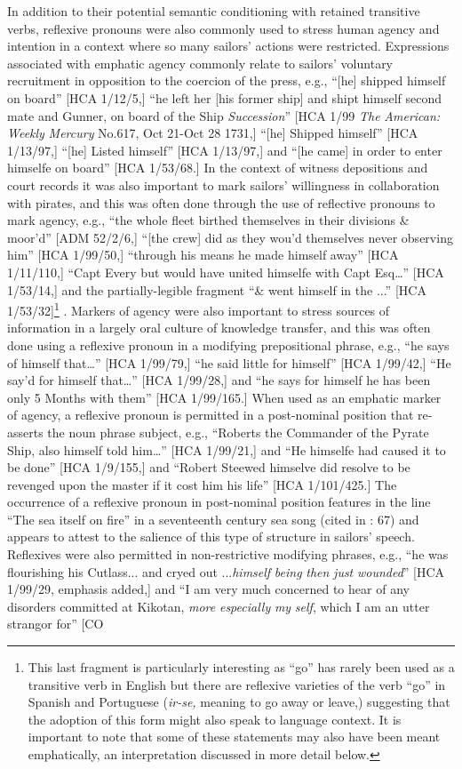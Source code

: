   In addition to their potential semantic conditioning with retained transitive verbs, reflexive pronouns were also commonly used to stress human agency and intention in a context where so many sailors’ actions were restricted. Expressions associated with emphatic agency commonly relate to sailors’ voluntary recruitment in opposition to the coercion of the press, e.g., “[he] shipped himself on board” [HCA 1/12/5,] “he left her [his former ship] and shipt himself second mate and Gunner, on board of the Ship \textit{Succession}” [HCA 1/99 \textit{The} \textit{American:} \textit{Weekly} \textit{Mercury} No.617, Oct 21-Oct 28 1731,] “[he] Shipped himself” [HCA 1/13/97,] “[he] Listed himself” [HCA 1/13/97,] and “[he came] in order to enter himselfe on board” [HCA 1/53/68.] In the context of witness depositions and court records it was also important to mark sailors’ willingness in collaboration with pirates, and this was often done through the use of reflective pronouns to mark agency, e.g., “the whole fleet birthed themselves in their divisions \& moor’d” [ADM 52/2/6,] “[the crew] did as they wou’d themselves never observing him” [HCA 1/99/50,] “through his means he made himself away” [HCA 1/11/110,] “Capt Every but would have united himselfe with Capt Esq…” [HCA 1/53/14,] and the partially-legible fragment “\& went himself in the ...” [HCA 1/53/32]\footnote{This last fragment is particularly interesting as “go” has rarely been used as a transitive verb in English but there are reflexive varieties of the verb “go” in Spanish and Portuguese (\textit{ir-se,} meaning to go away or leave,) suggesting that the adoption of this form might also speak to language context. It is important to note that some of these statements may also have been meant emphatically, an interpretation discussed in more detail below.} . Markers of agency were also important to stress sources of information in a largely oral culture of knowledge transfer, and this was often done using a reflexive pronoun in a modifying prepositional phrase, e.g., “he says of himself that…” [HCA 1/99/79,] “he said little for himself” [HCA 1/99/42,] “He say’d for himself that…” [HCA 1/99/28,] and “he says for himself he has been only 5 Months with them” [HCA 1/99/165.] When used as an emphatic marker of agency, a reflexive pronoun is permitted in a post-nominal position that re-asserts the noun phrase subject, e.g., “Roberts the Commander of the Pyrate Ship, also himself told him…” [HCA 1/99/21,] and “He himselfe had caused it to be done” [HCA 1/9/155,] and “Robert Steewed himselve did resolve to be revenged upon the master if it cost him his life” [HCA 1/101/425.] The occurrence of a reflexive pronoun in post-nominal position features in the line “The sea itself on fire” in a seventeenth century sea song (cited in \citealt{Palmer1986}: 67) and appears to attest to the salience of this type of structure in sailors’ speech. Reflexives were also permitted in non-restrictive modifying phrases, e.g., “he was flourishing his Cutlass... and cryed out ...\textit{himself} \textit{being} \textit{then} \textit{just} \textit{wounded}” [HCA 1/99/29, emphasis added,] and “I am very much concerned to hear of any disorders committed at Kikotan, \textit{more} \textit{especially} \textit{my} \textit{self}, which I am an utter strangor for” [CO 